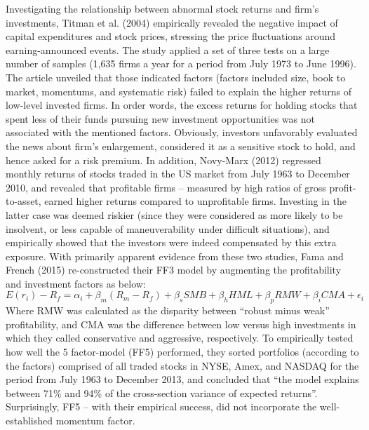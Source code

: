Investigating the relationship between abnormal stock returns and firm’s investments, Titman et al. (2004) empirically revealed the negative impact of capital expenditures and stock prices, stressing the price fluctuations around earning-announced events. The study applied a set of three tests on a large number of samples (1,635 firms a year for a period from July 1973 to June 1996). The article unveiled that those indicated factors (factors included size, book to market, momentums, and systematic risk) failed to explain the higher returns of low-level invested firms. In order words, the excess returns for holding stocks that spent less of their funds pursuing new investment opportunities was not associated with the mentioned factors. Obviously, investors unfavorably evaluated the news about firm’s enlargement, considered it as a sensitive stock to hold, and hence asked for a risk premium. In addition, Novy-Marx (2012) regressed monthly returns of stocks traded in the US market from July 1963 to December 2010, and revealed that profitable firms – measured by high ratios of gross profit-to-asset, earned higher returns compared to unprofitable firms. Investing in the latter case was deemed riskier (since they were considered as more likely to be insolvent, or less capable of maneuverability under difficult situations), and empirically showed that the investors were indeed compensated by this extra exposure. With primarily apparent evidence from these two studies, Fama and French (2015) re-constructed their FF3 model by augmenting the profitability and investment factors as below:\\
$ E(r_i)-R_f=\alpha_i+\beta_m(R_m-R_f)+\beta_sSMB+\beta_hHML+ \beta_pRMW+ \beta_iCMA+ \epsilon_i $ \\
Where RMW was calculated as the disparity between “robust minus weak” profitability, and CMA was the difference between low versus high investments in which they called conservative and aggressive, respectively. To empirically tested how well the 5 factor-model (FF5) performed, they sorted portfolios (according to the factors) comprised of all traded stocks in NYSE, Amex, and NASDAQ for the period from July 1963 to December 2013, and concluded that “the model explains between 71\% and 94\% of the cross-section variance of expected returns”. Surprisingly, FF5 – with their empirical success, did not incorporate the well-established momentum factor.
